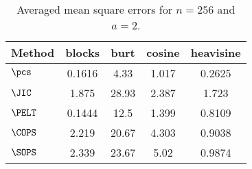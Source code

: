 \begin{table}[ht]
\centering
\begin{tabular}{lcccc}
  \hline
Method & blocks & burt & cosine & heavisine \\ 
  \hline
$\pcs$ & 0.1616 &  4.33 & 1.017 & 0.2625 \\ 
  $\JIC$ & 1.875 & 28.93 & 2.387 & 1.723 \\ 
  $\PELT$ & 0.1444 &  12.5 & 1.399 & 0.8109 \\ 
  $\COPS$ & 2.219 & 20.67 & 4.303 & 0.9038 \\ 
  $\SOPS$ & 2.339 & 23.67 &  5.02 & 0.9874 \\ 
   \hline
\end{tabular}
\caption{Averaged mean square errors for $n = 256$ and $a = 2$.} 
\label{tab:aMSEn256a2}
\end{table}
